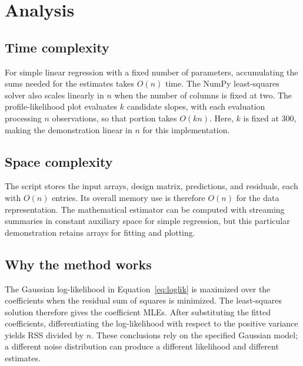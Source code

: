 \documentclass[11pt,a4paper]{article}
\begin{document}
\section{Analysis}
\subsection*{Time complexity}
For simple linear regression with a fixed number of parameters, accumulating the sums needed for the estimates takes $O(n)$ time. The NumPy least-squares solver also scales linearly in $n$ when the number of columns is fixed at two. The profile-likelihood plot evaluates $k$ candidate slopes, with each evaluation processing $n$ observations, so that portion takes $O(kn)$. Here, $k$ is fixed at 300, making the demonstration linear in $n$ for this implementation.

\subsection*{Space complexity}
The script stores the input arrays, design matrix, predictions, and residuals, each with $O(n)$ entries. Its overall memory use is therefore $O(n)$ for the data representation. The mathematical estimator can be computed with streaming summaries in constant auxiliary space for simple regression, but this particular demonstration retains arrays for fitting and plotting.

\subsection*{Why the method works}
The Gaussian log-likelihood in Equation~\eqref{eq:loglik} is maximized over the coefficients when the residual sum of squares is minimized. The least-squares solution therefore gives the coefficient MLEs. After substituting the fitted coefficients, differentiating the log-likelihood with respect to the positive variance yields RSS divided by $n$. These conclusions rely on the specified Gaussian model; a different noise distribution can produce a different likelihood and different estimates.
\end{document}
